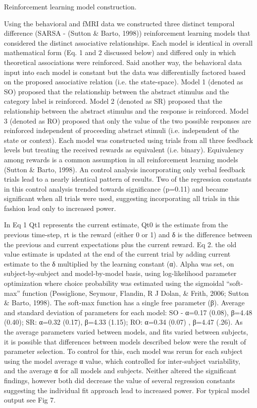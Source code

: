 Reinforcement learning model construction. 

Using the behavioral and fMRI data we constructed three distinct temporal difference (SARSA - (Sutton & Barto, 1998)) reinforcement learning models that considered the distinct associative relationships.   Each model is identical in overall mathematical form (Eq. 1 and 2 discussed below) and differed only in which theoretical associations were reinforced.  Said another way, the behavioral data input into each model is constant but the data was differentially factored based on the proposed associative relation (i.e. the state-space). Model 1 (denoted as SO) proposed that the relationship between the abstract stimulus and the category label is reinforced.  Model 2 (denoted as SR) proposed that the relationship between the abstract stimulus and the response is reinforced.  Model 3 (denoted as RO) proposed that only the value of the two possible responses are reinforced independent of proceeding abstract stimuli (i.e. independent of the state or context).   Each model was constructed using trials from all three feedback levels but treating the received rewards as equivalent (i.e. binary).  Equivalency among rewards is a common assumption in all reinforcement learning models (Sutton & Barto, 1998).  An control analysis incorporating only verbal feedback trials lead to a nearly identical pattern of results.  Two of the regression constants in this control analysis trended towards significance (p=0.11) and became significant when all trials were used, suggesting incorporating all trials in this fashion lead only to increased power.



 



In Eq 1 Qt1 represents the current estimate, Qt0 is the estimate from the previous time-step, rt is the reward (either 0 or 1) and δ is the difference between the previous and current expectations plus the current reward.  Eq 2. the old value estimate is updated at the end of the current trial by adding current estimate to the δ multiplied by the learning constant (α).  Alpha was set, on subject-by-subject and model-by-model basis, using log-likelihood parameter optimization where choice probability was estimated using the sigmoidal “soft-max” function (Pessiglione, Seymour, Flandin, R J Dolan, & Frith, 2006; Sutton & Barto, 1998).  The soft-max function has a single free parameter (β). Average and standard deviation of parameters for each model:  SO - α=0.17 (0.08), β=4.48 (0.40); SR: α=0.32 (0.17), β=4.33 (1.15); RO: α=0.34 (0.07) , β=4.47 (.26).   As the average parameters varied between models, and fits varied between subjects, it is possible that differences between models described below were the result of parameter selection.   To control for this, each model was rerun for each subject using the model average α value, which controlled for inter-subject variability, and the average α for all models and subjects.  Neither altered the significant findings, however both did decrease the value of several regression constants suggesting the individual fit approach lead to increased power.  For typical model output see Fig 7.

